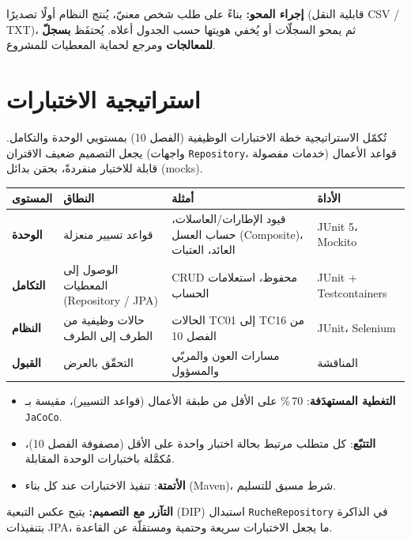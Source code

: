 \begin{encadre}
\textbf{إجراء المحو:} بناءً على طلب شخص معنيّ، يُنتج النظام أولًا تصديرًا (قابلية
النقل CSV / TXT)، ثم يمحو السجلّات أو يُخفي هويتها حسب الجدول أعلاه. يُحتفَظ
\textbf{بسجلّ للمعالجات} ومرجع لحماية المعطيات للمشروع.
\end{encadre}

\section{استراتيجية الاختبارات}
تُكمّل الاستراتيجية خطة الاختبارات الوظيفية (الفصل 10) بمستويي الوحدة والتكامل.
يجعل التصميم ضعيف الاقتران (واجهات \texttt{Repository}، خدمات مفصولة) قواعد
الأعمال قابلة للاختبار منفردةً، بحقن بدائل (mocks).

\begin{xltabular}{\textwidth}{>{\bfseries}p{2.8cm} X p{4.4cm} C{2.2cm}}
\toprule
\textbf{المستوى} & \textbf{النطاق} & \textbf{أمثلة} & \textbf{الأداة} \\
\midrule
\endhead
الوحدة & قواعد تسيير منعزلة & قيود الإطارات/العاسلات، حساب العسل (Composite)، العائد، العتبات & JUnit 5، Mockito \\
التكامل & الوصول إلى المعطيات (Repository / JPA) & CRUD محفوظ، استعلامات الحساب & JUnit + Testcontainers \\
النظام & حالات وظيفية من الطرف إلى الطرف & الحالات TC01 إلى TC16 من الفصل 10 & JUnit، Selenium \\
القبول & التحقّق بالعرض & مسارات العون والمربّي والمسؤول & المناقشة \\
\bottomrule
\end{xltabular}

\begin{itemize}
  \item \textbf{التغطية المستهدَفة}: 70\,\% على الأقل من طبقة الأعمال (قواعد التسيير)، مقيسة بـ \texttt{JaCoCo}.
  \item \textbf{التتبّع}: كل متطلب مرتبط بحالة اختبار واحدة على الأقل (مصفوفة الفصل 10)، مُكمَّلة باختبارات الوحدة المقابلة.
  \item \textbf{الأتمتة}: تنفيذ الاختبارات عند كل بناء (Maven)، شرط مسبق للتسليم.
\end{itemize}

\begin{encadre}
\textbf{التآزر مع التصميم:} يتيح عكس التبعية (DIP) استبدال \texttt{RucheRepository}
في الذاكرة بتنفيذات JPA، ما يجعل الاختبارات سريعة وحتمية ومستقلّة عن القاعدة.
\end{encadre}
